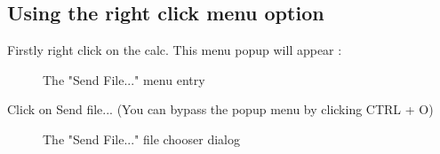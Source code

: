 \documentclass[10pt]{report}
\begin{document}
\subsection{Using the right click menu option}

Firstly right click on the calc.\newline
This menu popup will appear : \newline
\begin{figure}[H]
\centering
{}
\caption{The "Send File..." menu entry}
\end{figure}
Click on Send file...\newline
(You can bypass the popup menu by clicking CTRL + O)\newline
\begin{figure}[H]
\centering
{}
\caption{The "Send File..." file chooser dialog}
\end{figure}
\end{document}
